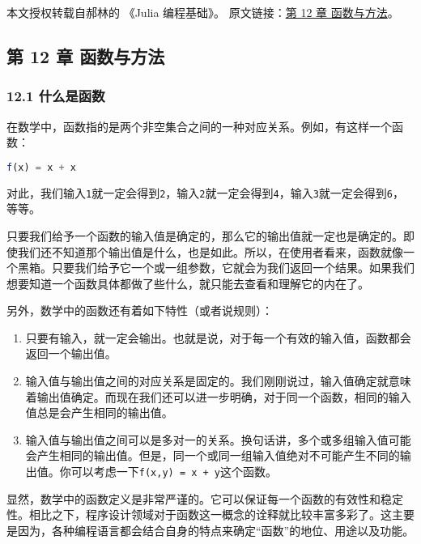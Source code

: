 
本文授权转载自郝林的 《Julia 编程基础》。 原文链接：\href{https://github.com/hyper0x/JuliaBasics/blob/master/book/ch11.md}{第 12 章 函数与方法}。

\subsection{第 12 章 函数与方法}

\subsubsection{12.1 什么是函数}

在数学中，函数指的是两个非空集合之间的一种对应关系。例如，有这样一个函数：

\begin{lstlisting}[language=julia]
f(x) = x + x
\end{lstlisting}

对此，我们输入\verb|1|就一定会得到\verb|2|，输入\verb|2|就一定会得到\verb|4|，输入\verb|3|就一定会得到\verb|6|，等等。

只要我们给予一个函数的输入值是确定的，那么它的输出值就一定也是确定的。即使我们还不知道那个输出值是什么，也是如此。所以，在使用者看来，函数就像一个黑箱。只要我们给予它一个或一组参数，它就会为我们返回一个结果。如果我们想要知道一个函数具体都做了些什么，就只能去查看和理解它的内在了。

另外，数学中的函数还有着如下特性（或者说规则）：

\begin{enumerate}
\item 只要有输入，就一定会输出。也就是说，对于每一个有效的输入值，函数都会返回一个输出值。
\item 输入值与输出值之间的对应关系是固定的。我们刚刚说过，输入值确定就意味着输出值确定。而现在我们还可以进一步明确，对于同一个函数，相同的输入值总是会产生相同的输出值。
\item 输入值与输出值之间可以是多对一的关系。换句话讲，多个或多组输入值可能会产生相同的输出值。但是，同一个或同一组输入值绝对不可能产生不同的输出值。你可以考虑一下\verb|f(x,y) = x + y|这个函数。
\end{enumerate}

显然，数学中的函数定义是非常严谨的。它可以保证每一个函数的有效性和稳定性。相比之下，程序设计领域对于函数这一概念的诠释就比较丰富多彩了。这主要是因为，各种编程语言都会结合自身的特点来确定“函数”的地位、用途以及功能。

